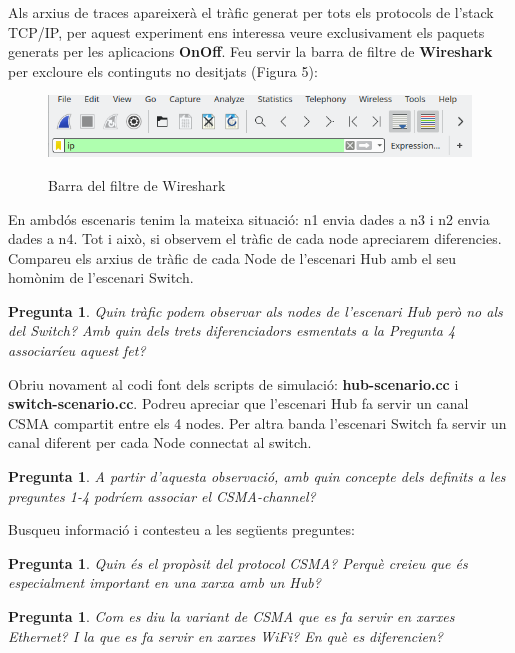 \documentclass[12pt,a4paper]{article}
\newcounter{exercises}
\newtheorem{exer}[exercises]{Pregunta}
\begin{document}
\begin{enumerate}
Als arxius de traces apareixerà el tràfic generat per tots els protocols de l'stack TCP/IP, per aquest experiment ens interessa veure exclusivament els paquets generats per les aplicacions \textbf{OnOff}. Feu servir la barra de filtre de \textbf{Wireshark} per excloure els continguts no desitjats (Figura 5):

\begin{figure}[!ht]
  \begin{center}
    \includegraphics[width=1\textwidth]{wireshark-filter}    
    \label{wireshark-filter}
    \caption{Barra del filtre de Wireshark}
  \end{center}
\end{figure}

En ambdós escenaris tenim la mateixa situació: n1 envia dades a n3 i n2 envia dades a n4. Tot i això, si observem el tràfic de cada node apreciarem diferencies. Compareu els arxius de tràfic de cada Node de l'escenari Hub amb el seu homònim de l'escenari Switch.

\begin{exer} Quin tràfic podem observar als nodes de l'escenari Hub però no als del Switch? Amb quin dels trets diferenciadors esmentats a la Pregunta 4 associaríeu aquest fet?\end{exer}

Obriu novament al codi font dels scripts de simulació: \textbf{hub-scenario.cc} i \textbf{switch-scenario.cc}. Podreu apreciar que l'escenari Hub fa servir un canal CSMA compartit entre els 4 nodes. Per altra banda l'escenari Switch fa servir un canal diferent per cada Node connectat al switch.

\begin{exer} A partir d'aquesta observació, amb quin concepte dels definits a les preguntes 1-4 podríem associar el CSMA-channel? \end{exer}

Busqueu informació i contesteu a les següents preguntes:
\begin{exer} Quin és el propòsit del protocol CSMA? Perquè creieu que és especialment important en una xarxa amb un Hub?\end{exer}
\begin{exer} Com es diu la variant de CSMA que es fa servir en xarxes Ethernet? I la que es fa servir en xarxes WiFi? En què es diferencien? \end{exer}


\end{enumerate}
\end{document}
